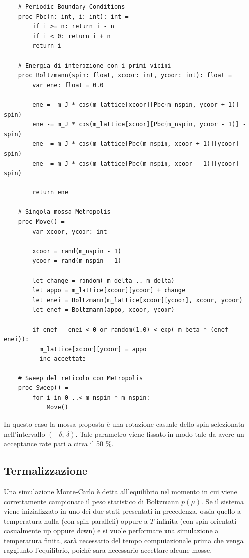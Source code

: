 \begin{verbatim}
    # Periodic Boundary Conditions
    proc Pbc(n: int, i: int): int =
        if i >= n: return i - n
        if i < 0: return i + n
        return i
      
    # Energia di interazione con i primi vicini
    proc Boltzmann(spin: float, xcoor: int, ycoor: int): float =
        var ene: float = 0.0
      
        ene = -m_J * cos(m_lattice[xcoor][Pbc(m_nspin, ycoor + 1)] - spin)
        ene -= m_J * cos(m_lattice[xcoor][Pbc(m_nspin, ycoor - 1)] - spin)
        ene -= m_J * cos(m_lattice[Pbc(m_nspin, xcoor + 1)][ycoor] - spin)
        ene -= m_J * cos(m_lattice[Pbc(m_nspin, xcoor - 1)][ycoor] - spin)
      
        return ene
    
    # Singola mossa Metropolis
    proc Move() =
        var xcoor, ycoor: int
      
        xcoor = rand(m_nspin - 1)
        ycoor = rand(m_nspin - 1)
      
        let change = random(-m_delta .. m_delta)
        let appo = m_lattice[xcoor][ycoor] + change
        let enei = Boltzmann(m_lattice[xcoor][ycoor], xcoor, ycoor)
        let enef = Boltzmann(appo, xcoor, ycoor)
      
        if enef - enei < 0 or random(1.0) < exp(-m_beta * (enef - enei)):
          m_lattice[xcoor][ycoor] = appo
          inc accettate
    
    # Sweep del reticolo con Metropolis
    proc Sweep() =
        for i in 0 ..< m_nspin * m_nspin:
            Move()
\end{verbatim}    

In questo caso la mossa proposta è una rotazione casuale dello spin selezionata nell'intervallo $\left(-\delta,\,\delta\right)$. Tale 
parametro viene fissato in modo tale da avere un acceptance rate pari a circa il 50 \%. 


\subsection{Termalizzazione}

Una simulazione Monte-Carlo è detta all'equilibrio nel momento in cui viene correttamente campionato il peso statistico di Boltzmann 
$p\left(\mu\right)$. Se il sistema viene inizializzato in uno dei due stati presentati in precedenza, ossia quello a temperatura 
nulla (con spin paralleli) oppure a $T$ infinita (con spin orientati casualmente up oppure down) e si vuole performare una simulazione a 
temperatura finita, sarà necessario del tempo computazionale prima che venga raggiunto l'equilibrio, poichè sara necessario accettare 
alcune mosse.

